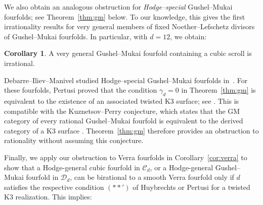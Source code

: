 \documentclass[10pt]{amsart}
\numberwithin{equation}{section}
\theoremstyle{definition}
\newtheorem{corollary}[theorem]{Corollary}
\theoremstyle{plain}
\numberwithin{theorem}{section}
\begin{document}

We also obtain an analogous obstruction for \emph{Hodge--special} Gushel--Mukai fourfolds; see Theorem~\ref{thm:gm} below. To our knowledge, this gives the first irrationality results for
very general members of fixed Noether--Lefschetz divisors of
Gushel--Mukai fourfolds. In particular, with $d=12$, we obtain:

\begin{corollary}\label{cor:scroll}
A very general Gushel--Mukai fourfold containing a cubic scroll is
irrational.
\end{corollary}

Debarre--Iliev--Manivel studied Hodge--special Gushel--Mukai fourfolds in~\cite[\S6]{debarre2015special}. For these fourfolds, Pertusi proved that the condition $\gamma_d=0$ in Theorem~\ref{thm:gm} is equivalent to the existence of an associated twisted K3 surface; see \cite[Theorem~1.1]{pertusi2019double}. This is compatible with the Kuznetsov--Perry conjecture, which states that the GM category of every rational Gushel--Mukai fourfold is
equivalent to the derived category of a K3 surface
\cite[Conjecture~3.12]{Kuznetsov2016DerivedCO}.  Theorem~\ref{thm:gm} therefore provides an obstruction to rationality without assuming this conjecture.

Finally, we apply our obstruction to  Verra fourfolds in Corollary~\ref{cor:verra} to show that a Hodge-general cubic fourfold in $\mathcal C_d$, or a Hodge-general Gushel--Mukai fourfold in $\mathcal D_d$, can be
birational to a smooth Verra fourfold only if $d$ satisfies the respective condition $(**')$ of Huybrechts or Pertusi for a twisted K3 realization. This implies:
\end{document}
